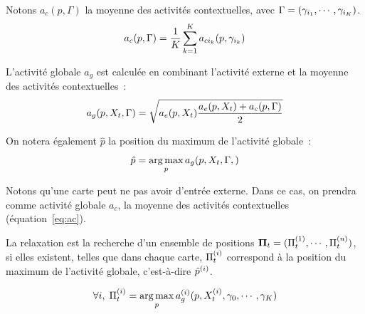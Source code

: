 \documentclass[../main]{subfiles}
\begin{document}
Notons $a_c(p, \Gamma)$ la moyenne des activités contextuelles, avec $\Gamma = (\gamma_{i_1}, \cdots, \gamma_{i_K})$.
\begin{equation}\label{eq:ac}
a_c(p, \Gamma) = \frac{1}{K}\sum_{k=1}^K {a_{ci_k}(p,\gamma_{i_k})}
\end{equation}

L'activité globale $a_g$ est calculée en combinant l'activité externe et la moyenne des activités contextuelles~:
\begin{equation}
\label{eq:global_act}
a_g(p, X_t,\Gamma) = \sqrt{a_e(p, X_t) \frac{a_e(p, X_t) +  a_c(p, \Gamma)}{2}}
\end{equation}

On notera également $\hat{p}$ la position du maximum de l'activité globale~:
\begin{equation}
\label{argmax}
\hat{p} = \operatorname*{arg\,max}_p a_g(p, X_t, \Gamma,)
\end{equation}

Notons qu'une carte peut ne pas avoir d'entrée externe. Dans ce cas, on prendra comme activité globale $a_c$, la moyenne des activités contextuelles (équation~\ref{eq:ac}).

La relaxation est la recherche d'un ensemble de positions $\mathbf{\Pi}_t = (\Pi^{({1})}_t, \cdots, \Pi^{({n})}_t)$, si elles existent, telles que dans chaque carte, $\Pi^{({i})}_t$ correspond à la position du maximum de l'activité globale, c'est-à-dire $\hat{p}^{({i})}$.

\begin{equation}
\forall i, \; \Pi^{({i})}_t = \operatorname*{arg\,max}\limits_p a_g^{({i})}(p, X^{({i})}_t, \gamma_0, \cdots, \gamma_K)
\end{equation}
\end{document}
